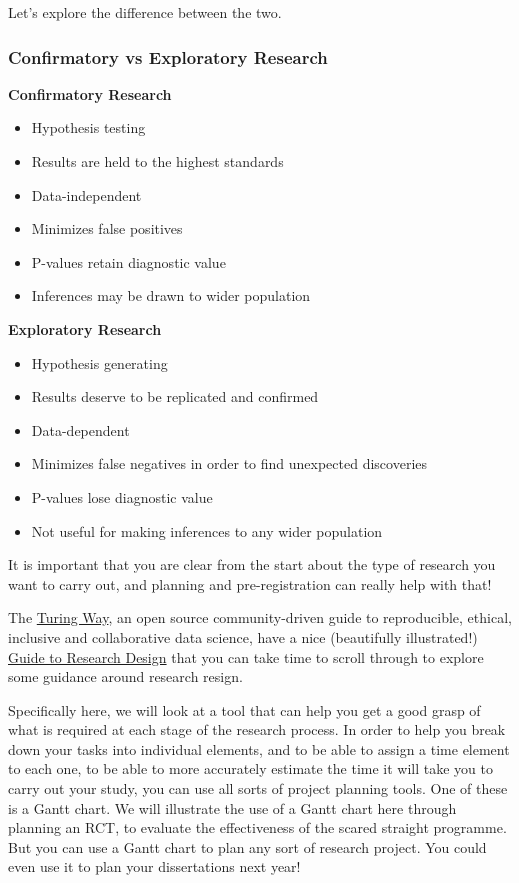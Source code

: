 \documentclass[
]{book}
\providecommand{\tightlist}{%
  \setlength{\itemsep}{0pt}\setlength{\parskip}{0pt}}
\begin{document}
Let's explore the difference between the two.

\hypertarget{confirmatory-vs-exploratory-research}{%
\subsubsection{Confirmatory vs Exploratory Research}\label{confirmatory-vs-exploratory-research}}

\textbf{Confirmatory Research}

\begin{itemize}
\tightlist
\item
  Hypothesis testing
\item
  Results are held to the highest standards
\item
  Data-independent
\item
  Minimizes false positives
\item
  P-values retain diagnostic value
\item
  Inferences may be drawn to wider population
\end{itemize}

\textbf{Exploratory Research}

\begin{itemize}
\tightlist
\item
  Hypothesis generating
\item
  Results deserve to be replicated and confirmed
\item
  Data-dependent
\item
  Minimizes false negatives in order to find unexpected discoveries
\item
  P-values lose diagnostic value
\item
  Not useful for making inferences to any wider population
\end{itemize}

It is important that you are clear from the start about the type of research you want to carry out, and planning and pre-registration can really help with that!

The \href{https://the-turing-way.netlify.app/welcome.html}{Turing Way}, an open source community-driven guide to reproducible, ethical, inclusive and collaborative data science, have a nice (beautifully illustrated!) \href{https://the-turing-way.netlify.app/project-design/project-design.html}{Guide to Research Design} that you can take time to scroll through to explore some guidance around research resign.

Specifically here, we will look at a tool that can help you get a good grasp of what is required at each stage of the research process. In order to help you break down your tasks into individual elements, and to be able to assign a time element to each one, to be able to more accurately estimate the time it will take you to carry out your study, you can use all sorts of project planning tools. One of these is a Gantt chart. We will illustrate the use of a Gantt chart here through planning an RCT, to evaluate the effectiveness of the scared straight programme. But you can use a Gantt chart to plan any sort of research project. You could even use it to plan your dissertations next year!
\end{document}
